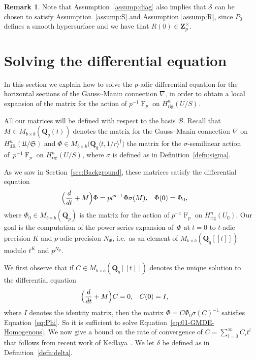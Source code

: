 \documentclass[a4paper,11pt]{article}
\numberwithin{equation}{section}
\newcommand{\ZZ}{\mathbf{Z}} %
\newcommand{\QQ}{\mathbf{Q}} %
\DeclareMathOperator{\Frob}{F}           %
\providecommand{\HdR}{H_{\text{dR}}}    %
\providecommand{\Hrig}{H_{\text{rig}}}  %
\providecommand{\cB}{\mathcal{B}} %
\theoremstyle{definition}
\newtheorem{rem}[thm]{Remark}
\begin{document}
\begin{rem}
Note that Assumption~\ref{assump:diag} 
also implies that $\mathcal{S}$ can be chosen to satisfy Assumption~\ref{assump:S} 
and Assumption \ref{assump:R}, since $P_0$ defines a smooth hypersurface and 
we have that $R(0) \in \ZZ_p^{\times}$. 
\end{rem}


\section{Solving the differential equation}
\label{sec:DifferentialSystem}

In this section we explain how to solve the $p$-adic differential 
equation for the horizontal sections of the Gauss--Manin 
connection $\nabla$, in order to obtain a local expansion of the 
matrix for the action of $p^{-1} \Frob_p$ on $\Hrig^{n}(U/S)$.  

All our matrices will be defined with respect to the basis $\cB$. Recall 
that $M \in M_{b \times b}(\QQ_q(t))$ denotes 
the matrix for the Gauss--Manin connection $\nabla$ on 
$\HdR^n(\mathfrak{U}/\mathfrak{S})$ and 
$\Phi \in M_{b \times b} \bigl(\QQ_q \langle t,1/r \rangle^{\dag} \bigr)$ 
the matrix for the $\sigma$-semilinear action of~$p^{-1} \Frob_p$ 
on $\Hrig^{n}(U/S)$, where $\sigma$ is defined as 
in Definition~\ref{defn:sigma}.

As we saw in Section~\ref{sec:Background}, these matrices satisfy 
the differential equation
\begin{align} \label{eq:Phi}
\Bigl(\frac{d}{dt} + M\Bigr) \Phi &= p t^{p-1} \Phi \sigma(M), &\Phi(0)& = \Phi_0, 
\end{align}
where $\Phi_0 \in M_{b \times b}(\QQ_p)$ is the matrix for the action 
of $p^{-1} \Frob_p$ on $\Hrig^n(U_0)$. Our goal is the computation of 
the power series expansion of~$\Phi$ at $t=0$ to $t$-adic precision $K$ 
and $p$-adic precision $N_{\Phi}$, i.e.\ as an element of 
$M_{b \times b}(\QQ_q[[t]])$ modulo $t^K$ and $p^{N_{\Phi}}$.

We first observe that if 
$C \in M_{b \times b}(\QQ_q[[t]])$ denotes 
the unique solution to the differential equation
\begin{align} \label{eq:01-GMDE-Homogenous}
\Bigl(\frac{d}{dt} + M\Bigr) C &= 0, &C(0)&=I, 
\end{align}
where $I$ denotes the identity matrix, 
then the matrix $\Phi = C \Phi_0 \sigma(C)^{-1}$ satisfies 
Equation~\eqref{eq:Phi}. So it is sufficient to solve 
Equation~\eqref{eq:01-GMDE-Homogenous}. 
We now give a bound on the rate of 
convergence of $C=\sum_{i=0}^{\infty} C_i t^i$ that
follows from recent work of 
Kedlaya~\citep{Kedlaya2010}. 
We let $\delta$ be defined as in Definition~\ref{defn:delta}. 
\end{document}
